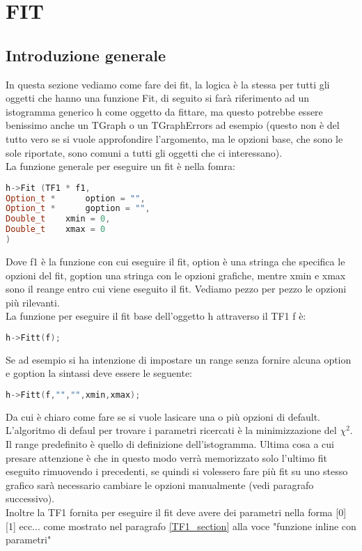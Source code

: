 \chapter{FIT}
\section{Introduzione generale}
In questa sezione vediamo come fare dei fit, la logica è la stessa per tutti gli oggetti che hanno una funzione Fit, di seguito si farà riferimento ad un istogramma generico h come oggetto da fittare, ma questo potrebbe essere benissimo anche un TGraph o un TGraphErrors ad esempio (questo non è del tutto vero se si vuole approfondire l'argomento, ma le opzioni base, che sono le sole riportate, sono comuni a tutti gli oggetti che ci interessano).\\
La funzione generale per eseguire un fit è nella fomra:
\begin{lstlisting}[language=C++,label={cod1},mathescape=true,breaklines=true]
h->Fit (TF1 * f1,
Option_t *  	option = "",
Option_t *  	goption = "",
Double_t  	xmin = 0,
Double_t  	xmax = 0 
) 	
\end{lstlisting}
Dove f1 è la funzione con cui eseguire il fit, option è una stringa che specifica le opzioni del fit, goption una stringa con le opzioni grafiche, mentre xmin e xmax sono il reange entro cui viene eseguito il fit. Vediamo pezzo per pezzo le opzioni più rilevanti.\\
La funzione per eseguire il fit base dell'oggetto h attraverso il TF1 f è:
\begin{lstlisting}[language=C++,label={cod1},mathescape=true,breaklines=true]
	h->Fitt(f);
\end{lstlisting}
Se ad esempio si ha intenzione di impostare un range senza fornire alcuna option e goption la sintassi deve essere le seguente:
\begin{lstlisting}[language=C++,label={cod1},mathescape=true,breaklines=true]
	h->Fitt(f,"","",xmin,xmax);
\end{lstlisting}
Da cui è chiaro come fare se si vuole lasicare una o più opzioni di default.\\
L'algoritmo di defaul per trovare i parametri ricercati è la minimizzazione del $\chi^2$. Il range predefinito è quello di definizione dell'istogramma. Ultima cosa a cui presare attenzione è che in questo modo verrà memorizzato solo l'ultimo fit eseguito rimuovendo i precedenti, se quindi si volessero fare più fit su uno stesso grafico sarà necessario cambiare le opzioni manualmente (vedi paragrafo successivo).\\
Inoltre la TF1 fornita per eseguire il fit deve avere dei parametri nella forma [0] [1] ecc... come mostrato nel paragrafo \ref{TF1_section} alla voce "funzione inline con parametri"

